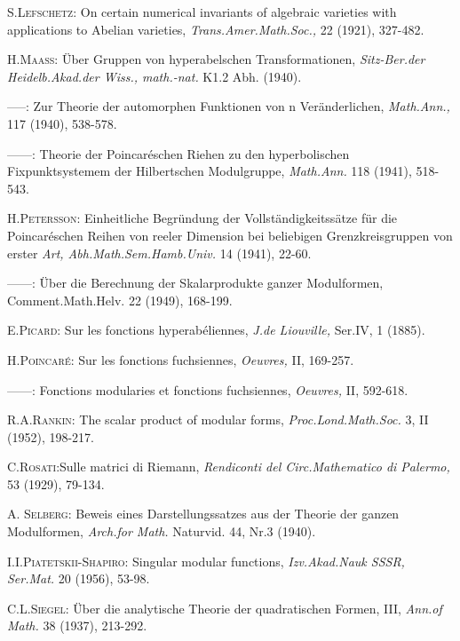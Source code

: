 \begin{thebibliography}{99}
 \textsc{S.\@ Lefschetz:} On certain numerical invariants
  of algebraic varieties with applications to Abelian varieties, {\em
    Trans.\@ Amer.\@ Math.\@ Soc.,} 22 (1921), 327-482.

 \textsc{H.\@ Maass:} \"Uber Gruppen von hyperabelschen
  Transformationen, {\em Sitz-Ber.\@ der Heidelb.\@ Akad.\@ der Wiss.,
    math.-nat.} K1.\@ 2 Abh. (1940).

 -----: Zur Theorie der automorphen Funktionen von n
  Ver\"anderlichen, {\em Math.\@ Ann.,} 117 (1940), 538-578.

 ------: Theorie der Poincar\'eschen Riehen zu den
  hyperbolischen Fixpunktsystemem der Hilbertschen Modulgruppe, {\em
    Math.\@ Ann.} 118 (1941), 518-543.

 \textsc{H.\@ Petersson:} Einheitliche Begr\"undung der
  Vollst\"andigkeitss\"atze f\"ur die Poincar\'eschen Reihen von
  reeler Dimension bei beliebigen Grenzkreisgruppen von erster {\em
    Art, Abh.\@ Math.\@ Sem.\@ Hamb.\@ Univ.} 14 (1941), 22-60.

 ------: \"Uber die Berechnung der Skalarprodukte ganzer
  Modulformen, Comment.\@ Math.\@ Helv. 22 (1949), 168-199.

 \textsc{E.\@ Picard:} Sur les fonctions
  hyperab\'eliennes, {\em J.\@ de Liouville,} Ser.\@ IV, 1 (1885).

 \textsc{H.\@ Poincar\'e:} Sur les fonctions fuchsiennes,
  {\em Oeuvres,} II, 169-257.

 ------: Fonctions modularies et fonctions fuchsiennes,
  {\em Oeuvres,} II, 592-618.

 \textsc{R.\@ A.\@ Rankin:} The scalar product of modular
  forms, {\em Proc.\@ Lond.\@ Math.\@ Soc.} 3, II (1952), 198-217.

 \textsc{C.\@ Rosati:}\pageoriginale Sulle matrici di Riemann, {\em
  Rendiconti del Circ.\@ Mathematico di Palermo,} 53 (1929), 79-134.

 \textsc{A. Selberg:} Beweis eines Darstellungssatzes aus
  der Theorie der ganzen Modulformen, {\em Arch.\@ for Math.}
  Naturvid. 44, Nr.\@ 3 (1940).

 \textsc{I.\@ I.\@ Piatetskii-Shapiro:} Singular modular
  functions, {\em Izv.\@ Akad.\@ Nauk SSSR, Ser.\@ Mat.} 20 (1956), 53-98.

 \textsc{C.\@ L.\@ Siegel:} \"Uber die analytische Theorie
  der quadratischen Formen, III, {\em Ann.\@ of Math.} 38 (1937), 213-292.


\end{thebibliography}
